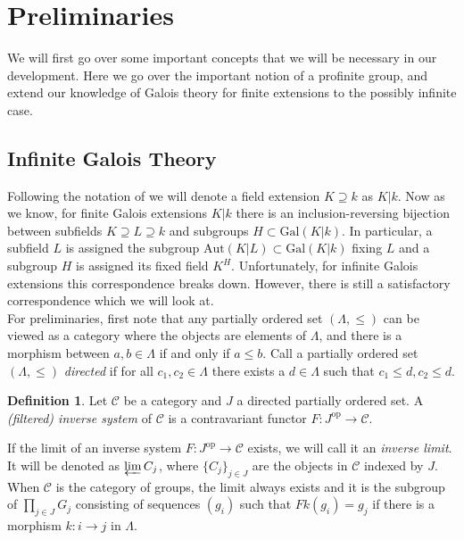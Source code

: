 \documentclass{article}
\theoremstyle{definition}
\newtheorem{definition}[theorem]{Definition}
\theoremstyle{remark}
\newcommand{\mc}[1]{\mathcal{#1}}
\begin{document}
\section{Preliminaries}
We will first go over some important concepts that we will be necessary in our development.
Here we go over the important notion of a profinite group, and extend our knowledge of Galois theory for finite extensions to the possibly infinite case.

\subsection{Infinite Galois Theory}

Following the notation of \cite{Szamuely} we will denote a field extension $K \supseteq k$ as $K|k$. 
Now as we know, for finite Galois extensions $K|k$ there is an inclusion-reversing bijection between subfields $K \supseteq L \supseteq k$ and subgroups $H \subset \text{Gal}(K|k)$.
In particular, a subfield $L$ is assigned the subgroup $\text{Aut}(K|L) \subset \text{Gal}(K|k)$ fixing $L$ and a subgroup $H$ is assigned its fixed field $K^H$.
Unfortunately, for infinite Galois extensions this correspondence breaks down.
However, there is still a satisfactory correspondence which we will look at.\\

For preliminaries, first note that any partially ordered set $(\Lambda, \leq)$ can be viewed as a category where the objects are elements of $\Lambda$, and there is a morphism between $a,b \in \Lambda$ if and only if $a \leq b$.
Call a partially ordered set $(\Lambda, \leq)$ \textit{directed} if for all $c_1, c_2 \in \Lambda$ there exists a $d \in \Lambda$ such that $c_1 \leq d, c_2 \leq d$.

\begin{definition}
	Let $\mc{C}$ be a category and $J$ a directed partially ordered set. A \textit{(filtered) inverse system} of $\mc{C}$ is a contravariant functor $F: J^{\text{op}} \to \mc{C}$.
\end{definition}

If the limit of an inverse system $F: J^{\text{op}} \to \mc{C}$ exists, we will call it an \textit{inverse limit}.
It will be denoted as $\varprojlim C_{j}$, where $\{C_j\}_{j \in J}$ are the objects in $\mc{C}$ indexed by $J$.
When $\mc{C}$ is the category of groups, the limit always exists and it is the subgroup of $\prod_{j \in J} G_j$ consisting of sequences $(g_i)$ such that $Fk(g_i) = g_j$ if there is a morphism $k: i  \to j$ in $\Lambda$.
\end{document}
